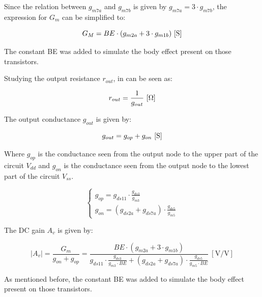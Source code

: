 Since the relation between $g_{m7a}$ and $g_{m7b}$ is given by $g_{m7a} = 3 \cdot g_{m7b}$, the expression for $G_m$ can be simplified to:  

\begin{equation}
    G_M = BE \cdot (g_{m2a} + 3 \cdot g_{m1b}) \ [\si{\siemens}] \\
    \label{eq:GM_BE}
\end{equation}

The constant BE was added to simulate the body effect present on those transistors.

Studying the output resistance $r_{out}$, in can be seen as:

\begin{equation}
    r_{out} = \frac{1}{g_{out}} \ [\Omega] \\
    \label{eq:rout}
\end{equation}

The output conductance $g_{out}$ is given by:

\begin{equation}
    g_{out} = g_{op} + g_{on} \ [\si{\siemens}] \\
    \label{eq:gout}
\end{equation}

Where $g_{op}$ is the conductance seen from the output node to the upper part of the circuit $V_{dd}$ and $g_{on}$ is the conductance seen from the output node to the lowest part of the circuit $V_{ss}$.

\begin{equation}
    \begin{cases}
        g_{op} = g_{ds11} \cdot \frac{g_{ds3}}{g_{m3}} \\
        g_{on} = \left( g_{ds2a} + g_{ds7a} \right) \cdot \frac{g_{ds5}}{g_{m5}}
    \end{cases}
    \label{eq:output_conductance}
\end{equation}

The DC gain $A_v$ is given by:

\begin{equation}
    |A_v| = \frac{G_m}{g_{on} + g_{op}} = \frac{BE \cdot (g_{m2a} + 3 \cdot g_{m1b})}{g_{ds11} \cdot \frac{g_{ds3}}{g_{m3}\cdot BE} + (g_{ds2a} + g_{ds7a}) \cdot \frac{g_{ds5}}{g_{m5} \cdot BE}} \ [\si{\volt/\volt}]
    \label{eq:Av}
\end{equation}

As mentioned before, the constant BE was added to simulate the body effect present on those transistors.

